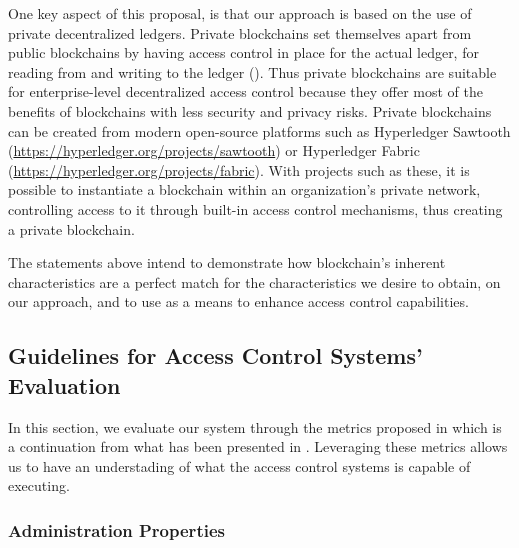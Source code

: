 One key aspect of this proposal, is that our approach is based on the use of private decentralized ledgers. Private blockchains set themselves apart from public blockchains by having access control in place for the actual ledger, for reading from and writing to the ledger (\cite{pilkington_blockchain_2016}). Thus private blockchains are suitable for enterprise-level decentralized access control because they offer most of the benefits of blockchains with less security and privacy risks. Private blockchains can be created from modern open-source platforms such as Hyperledger Sawtooth (\url{https://hyperledger.org/projects/sawtooth}) or Hyperledger Fabric (\url{https://hyperledger.org/projects/fabric}). With projects such as these, it is possible to instantiate a blockchain within an organization's private network, controlling access to it through built-in access control mechanisms, thus creating a private blockchain.

The statements above intend to demonstrate how blockchain's inherent characteristics are a perfect match for the characteristics we desire to obtain, on our approach, and to use as a means to enhance access control capabilities.

\subsection{Guidelines for Access Control Systems' Evaluation}

In this section, we evaluate our system through the metrics proposed in \cite{hu_guidelines_2012} which is a continuation from what has been presented in \cite{hu_assessment_2006}. Leveraging these metrics allows us to have an understading of what the access control systems is capable of executing.

\subsubsection{Administration Properties}

